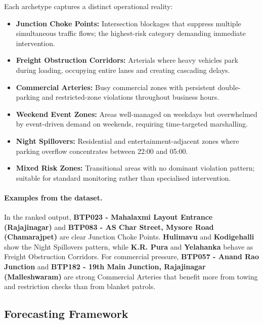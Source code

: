 \documentclass[12pt,a4paper]{article}
\begin{document}
Each archetype captures a distinct operational reality:
\begin{itemize}[leftmargin=1.5em, itemsep=2pt]
  \item \textbf{Junction Choke Points:} Intersection blockages that suppress multiple simultaneous
  traffic flows; the highest-risk category demanding immediate intervention.
  \item \textbf{Freight Obstruction Corridors:} Arterials where heavy vehicles park during
  loading, occupying entire lanes and creating cascading delays.
  \item \textbf{Commercial Arteries:} Busy commercial zones with persistent double-parking
  and restricted-zone violations throughout business hours.
  \item \textbf{Weekend Event Zones:} Areas well-managed on weekdays but overwhelmed by
  event-driven demand on weekends, requiring time-targeted marshalling.
  \item \textbf{Night Spillovers:} Residential and entertainment-adjacent zones where
  parking overflow concentrates between 22:00 and 05:00.
  \item \textbf{Mixed Risk Zones:} Transitional areas with no dominant violation pattern;
  suitable for standard monitoring rather than specialised intervention.
\end{itemize}

\paragraph{Examples from the dataset.}
In the ranked output, \textbf{BTP023 - Mahalaxmi Layout Entrance (Rajajinagar)} and
\textbf{BTP083 - AS Char Street, Mysore Road (Chamarajpet)} are clear Junction Choke Points.
\textbf{Hulimavu} and \textbf{Kodigehalli} show the Night Spillovers pattern, while
\textbf{K.R. Pura} and \textbf{Yelahanka} behave as Freight Obstruction Corridors.
For commercial pressure, \textbf{BTP057 - Anand Rao Junction} and
\textbf{BTP182 - 19th Main Junction, Rajajinagar (Malleshwaram)} are strong Commercial
Arteries that benefit more from towing and restriction checks than from blanket patrols.



\subsection{Forecasting Framework}
\end{document}
